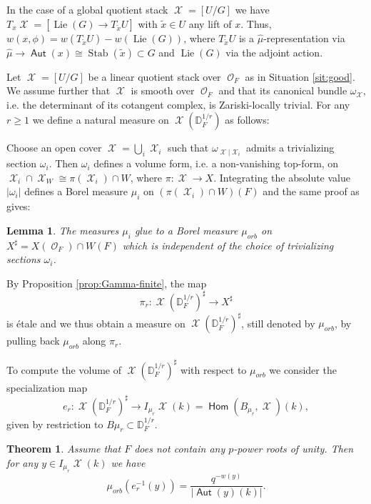 \documentclass{article}
\DeclareMathOperator{\Xc}{\mathcal{X}}
\DeclareMathOperator{\Oc}{\mathcal{O}}
\DeclareMathOperator{\Hom}{\mathsf{Hom}}
\DeclareMathOperator{\stab}{\mathrm{Stab}}
\DeclareMathOperator{\Lie}{Lie}
\DeclareMathOperator{\Aut}{\mathsf{Aut}}
\newcommand{\Dr}[1][r]{\mathbb{D}_F^{1/#1}}
\theoremstyle{definition}
\theoremstyle{plain}
\newtheorem{theorem}[definition]{Theorem}
\newtheorem{lemma}[definition]{Lemma}
\begin{document}
In the case of a global quotient stack $\Xc=[U/G]$ we have $T_x\Xc = [\Lie(G) \to T_{\tilde{x}}U]$ with $\tilde{x} \in U$ any lift of $x$. Thus, $w(x,\phi) = w(T_{\tilde x}U) - w(\Lie(G))$, where $T_{\tilde x}U$ is a $\hat \mu$-representation via $\hat \mu \to \Aut(x) \cong \stab(\tilde{x}) \subset G$ and $\Lie(G)$ via the adjoint action. 



Let $\Xc = [U/G]$ be a linear quotient stack over $\Oc_F$ as in Situation \ref{sit:good}. We assume further that $\Xc$ is smooth over $\Oc_F$ and that its canonical bundle $\omega_{\Xc}$, i.e. the determinant of its cotangent complex, is Zariski-locally trivial. For any $r\geq 1$ we define a natural measure on $\Xc(\Dr)$ as follows:



Choose an open cover $\Xc = \bigcup_i \Xc_i$ such that $\omega_{\Xc|\Xc_i}$ admits a trivializing section $\omega_i$. Then $\omega_i$ defines a volume form, i.e. a non-vanishing top-form, on $\Xc_i \cap \Xc_W \cong \pi(\Xc_i) \cap W$, where $\pi: \Xc \to X$. Integrating the absolute value $|\omega_i|$ defines a Borel measure $\mu_i$ on $(\pi(\Xc_i) \cap W)(F)$ and the same proof as \cite[Proposition 3.1.2]{COW21} gives:

\begin{lemma} The measures $\mu_i$ glue to a Borel measure $\mu_{orb}$ on $X^\sharp = X(\Oc_F) \cap W(F)$ which is independent of the choice of trivializing sections $\omega_i$.    
\end{lemma}

By Proposition \ref{prop:Gamma-finite}, the map 
\[ \pi_r: \Xc(\Dr)^\sharp \to X^\sharp   \]
is étale and we thus obtain a measure on $\Xc(\Dr)^\sharp$, still denoted by $\mu_{orb}$, by pulling back $\mu_{orb}$ along $\pi_r$. 

To compute the volume of $\Xc(\Dr)^\sharp$ with respect to $\mu_{orb}$ we consider the specialization map 
\begin{equation}\label{ersp} e_r: \Xc(\Dr)^\sharp \to I_{\mu_r} \Xc(k) = \Hom(B_{\mu_r}, \Xc)(k),  \end{equation}
given by restriction to $B\mu_r \subset \Dr$.

\begin{theorem}\label{orbiorbi} Assume that $F$ does not contain any $p$-power roots of unity. Then for any $y \in I_{\mu_r} \Xc(k)$ we have 
\[ \mu_{orb}( e_r^{-1}(y)) = \frac{q^{-w(y)}}{|\Aut(y)(k)|}. \] \end{theorem}
\end{document}
